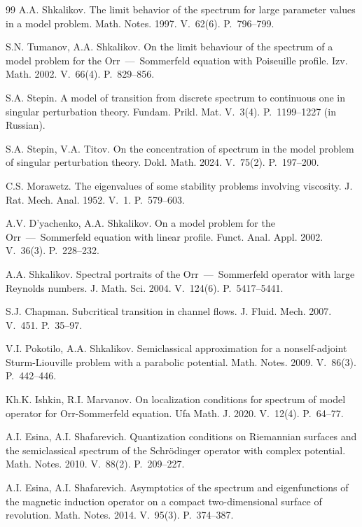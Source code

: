 \documentclass[10pt, a4paper]{article}
\theoremstyle{plain}
\theoremstyle{definition}
\numberwithin{equation}{section}
\begin{document}
\begin{thebibliography}{99}
A.A. Shkalikov. The limit behavior of the spectrum for large parameter values in
a model problem. Math. Notes. 1997. V.~62(6). P.~796--799.

S.N. Tumanov, A.A. Shkalikov. On the limit behaviour of the spectrum of a model
problem for the Orr~---~Sommerfeld equation with Poiseuille profile. Izv. Math.
2002. V.~66(4). P.~829--856.

S.A. Stepin. A model of transition from discrete spectrum to continuous one in
singular perturbation theory. Fundam. Prikl. Mat. V.~3(4). P.~1199--1227 (in Russian).

S.A. Stepin, V.A. Titov. On the concentration of spectrum in the model problem
of singular perturbation theory. Dokl. Math. 2024. V.~75(2). P.~197--200.

C.S. Morawetz. The eigenvalues of some stability problems involving
viscosity. J. Rat. Mech. Anal. 1952. V.~1. P.~579--603.

A.V. D'yachenko, A.A. Shkalikov. On a model problem for the Orr~---~Sommerfeld equation
with linear profile. Funct. Anal. Appl. 2002. V.~36(3). P.~228--232.

A.A. Shkalikov. Spectral portraits of the Orr~---~Sommerfeld operator with large Reynolds
numbers. J. Math. Sci. 2004. V.~124(6). P.~5417--5441.

S.J. Chapman. Subcritical transition in channel flows.
J. Fluid. Mech. 2007. V.~451. P.~35--97.

V.I. Pokotilo, A.A. Shkalikov. Semiclassical approximation for a nonself-adjoint
Sturm-Liouville problem with a parabolic potential. Math. Notes. 2009. V.~86(3).
P.~442--446.

Kh.K. Ishkin, R.I. Marvanov. On localization conditions for spectrum of model
operator for Orr-Sommerfeld equation. Ufa Math. J. 2020. V.~12(4). P.~64--77.

A.I. Esina, A.I. Shafarevich. Quantization conditions on Riemannian surfaces and
the semiclassical spectrum of the Schr\"odinger operator with complex potential. Math.
Notes. 2010. V.~88(2). P.~209--227.

A.I. Esina, A.I. Shafarevich. Asymptotics of the spectrum and eigenfunctions of the
magnetic induction operator on a compact two-dimensional surface of revolution.
Math. Notes. 2014. V.~95(3). P.~374--387.


\end{thebibliography}
\end{document}
